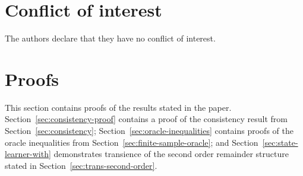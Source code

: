 \section*{Conflict of interest}

The authors declare that they have no conflict of interest.





\appendix

\section{Proofs}
\label{sec:proofs}

This section contains proofs of the results stated in the paper.
Section~\ref{sec:consistency-proof} contains a proof of the consistency result
from Section~\ref{sec:consistency}; Section~\ref{sec:oracle-inequalities}
contains proofs of the oracle inequalities from
Section~\ref{sec:finite-sample-oracle}; and
Section~\ref{sec:state-learner-with} demonstrates transience of the second
order remainder structure stated in Section~\ref{sec:trans-second-order}.


